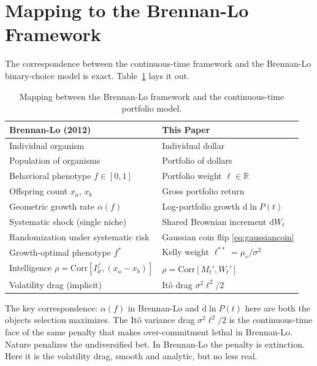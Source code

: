 \documentclass[11pt]{article}
\newcommand{\lkelly}{\ell^{**}}
\newcommand{\mue}{\mu_{e}}
\newcommand{\Corr}{\mathrm{Corr}}
\newcommand{\dd}{\mathrm{d}}
\begin{document}
\section{Mapping to the Brennan-Lo Framework}

The correspondence between the continuous-time framework and the
Brennan-Lo binary-choice model is exact. Table~\ref{tab:mapping}
lays it out.

\begin{table}[ht]
\centering
\caption{Mapping between the Brennan-Lo framework and the
continuous-time portfolio model.}
\label{tab:mapping}
\renewcommand{\arraystretch}{1.4}
\begin{tabular}{p{6.5cm} p{6.5cm}}
\toprule
\textbf{Brennan-Lo (2012)} & \textbf{This Paper} \\
\midrule
Individual organism & Individual dollar \\
Population of organisms & Portfolio of dollars \\
Behavioral phenotype $f \in [0,1]$ & Portfolio weight $\ell \in \mathbb{R}$ \\
Offspring count $x_{a}$, $x_{b}$ & Gross portfolio return \\
Geometric growth rate $\alpha(f)$ & Log-portfolio growth $\dd\ln P(t)$ \\
Systematic shock (single niche) & Shared Brownian increment $\dd W_{t}$ \\
Randomization under systematic risk & Gaussian coin flip \eqref{eq:gaussiancoin} \\
Growth-optimal phenotype $f^{*}$ & Kelly weight $\lkelly = \mue/\sigma^{2}$ \\
Intelligence $\rho = \Corr[I^{f}_{it}, (x_{a}-x_{b})]$ & $\rho = \Corr[M_{t}', W_{t}']$ \\
Volatility drag (implicit) & It\^{o} drag $\sigma^{2}\ell^{2}/2$ \\
\bottomrule
\end{tabular}
\end{table}

The key correspondence: $\alpha(f)$ in Brennan-Lo and $\dd\ln P(t)$
here are both the objects selection maximizes. The It\^{o} variance
drag $\sigma^{2}\ell^{2}/2$ is the continuous-time face of the same
penalty that makes over-commitment lethal in Brennan-Lo. Nature
penalizes the undiversified bet. In Brennan-Lo the penalty is
extinction. Here it is the volatility drag, smooth and analytic, but no
less real.
\end{document}
